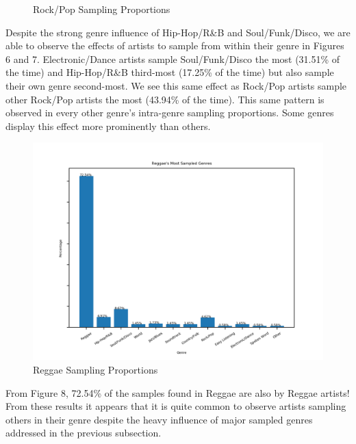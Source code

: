 \documentclass[pageno]{jpaper}
\begin{document}
\begin{figure}[H]
\centering
\caption{Electronic/Dance Sampling Proportions}\caption{Rock/Pop Sampling Proportions}
\label{fig:fig6}
\label{fig:fig7}
\end{figure}
Despite the strong genre influence of Hip-Hop/R\&B and Soul/Funk/Disco, we are able to observe the effects of artists to sample from within their genre in Figures 6 and 7. Electronic/Dance artists sample Soul/Funk/Disco the most (31.51\% of the time) and Hip-Hop/R\&B third-most (17.25\% of the time) but also sample their own genre second-most. We see this same effect as Rock/Pop artists sample other Rock/Pop artists the most (43.94\% of the time). This same pattern is observed in every other genre's intra-genre sampling proportions. Some genres display this effect more prominently than others.
\begin{figure}[H]
\includegraphics{./genreRatio/genreRatioReggae}
\caption{Reggae Sampling Proportions}
\label{fig:fig8}
\centering
\end{figure}
From Figure 8, 72.54\% of the samples found in Reggae are also by Reggae artists!
From these results it appears that it is quite common to observe artists sampling others in their genre despite the heavy influence of major sampled genres addressed in the previous subsection. 
\end{document}
